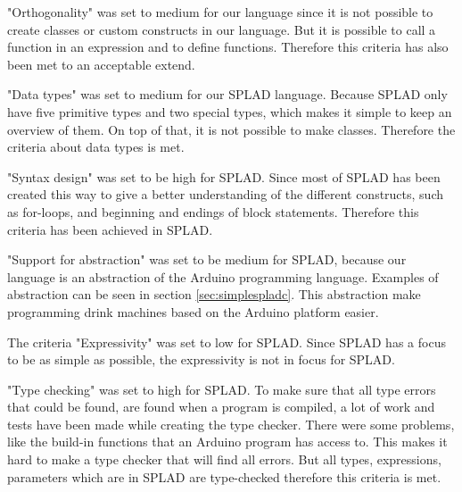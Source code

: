 "Orthogonality" was set to medium for our language since it is not possible to create classes or custom constructs in our language. But it is possible to call a function in an expression and to define functions. Therefore this criteria has also been met to an acceptable extend.

"Data types" was set to medium for our SPLAD language. Because SPLAD only have five primitive types and two special types, which makes it simple to keep an overview of them. On top of that, it is not possible to make classes. Therefore the criteria about data types is met.

"Syntax design" was set to be high for SPLAD. Since most of SPLAD has been created this way to give a better understanding of the different constructs, such as for-loops, and beginning and endings of block statements. Therefore this criteria has been achieved in SPLAD.

"Support for abstraction" was set to be medium for SPLAD, because our language is an abstraction of the Arduino programming language. Examples of abstraction can be seen in section \ref{sec:simplespladc}. This abstraction make programming drink machines based on the Arduino platform easier.

The criteria "Expressivity" was set to low for SPLAD. Since SPLAD has a focus to be as simple as possible, the expressivity is not in focus for SPLAD. 

"Type checking" was set to high for SPLAD. To make sure that all type errors that could be found, are found when a program is compiled, a lot of work and tests have been made while creating the type checker. There were some problems, like the build-in functions that an Arduino program has access to. This makes it hard to make a type checker that will find all errors. But all types, expressions, parameters which are in SPLAD are type-checked therefore this criteria is met. 